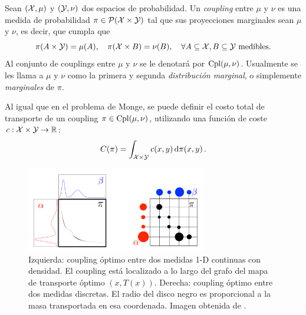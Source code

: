 {{	  \begin{definition}[Coupling]
		  Sean $(\cX, \mu)$ y $(\cY, \nu)$ dos espacios de probabilidad. Un \emph{coupling} entre $\mu$ y $\nu$ es una medida de probabilidad $\pi \in \ProbSpace[\cX \times \cY]$ tal que sus proyecciones marginales sean $\mu$ y $\nu$, es decir, que cumpla que
		  \begin{equation}
			  \label{eq:coupling}
			  \pi(A \times \cY) = \mu(A), \quad \pi(\cX \times B) = \nu(B), \quad \forall A \subseteq \cX, B \subseteq \cY \text{ medibles}.
		  \end{equation}
		  Al conjunto de couplings entre $\mu$ y $\nu$ se le denotará por $\Cpl(\mu, \nu)$. Usualmente se les llama a $\mu$ y $\nu$ como la primera y segunda \emph{distribución marginal}, o simplemente \emph{marginales} de $\pi$.
	  \end{definition}

	  Al igual que en el problema de Monge, se puede definir el costo total de transporte de un coupling $\pi \in \Cpl(\mu, \nu)$, utilizando una función de coste $c: \cX \times \cY \to \R$:
	  \begin{equation}
		  C(\pi) = \int_{\cX \times \cY} c(x, y) \dpi[x, y].
	  \end{equation}

	  \begin{figure}[t]
		  \centering
		  \includegraphics[width=0.7\textwidth]{img/transporte/coupling-example.png}
		  \caption{Izquierda: coupling óptimo entre dos medidas 1-D continuas con densidad. El coupling está localizado a lo largo del grafo del mapa de transporte óptimo $(x, T(x))$. Derecha: coupling óptimo entre dos medidas discretas. El radio del disco negro es proporcional a la masa transportada en esa coordenada. Imagen obtenida de \cite{peyre2019computational}.
			  \label{fig:coupling-example}}
	  \end{figure}

}}
